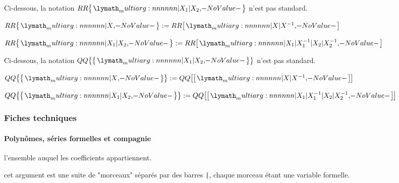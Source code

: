 \documentclass[12pt,a4paper]{article}
\newcommand\QQ{QQ}
\newcommand\RR{RR}
\newcommand\eqdef{:=}
\begin{document}

Ci-dessous, la notation $\setpolylaurent{\RR}{X_1 | X_2}$ n'est pas standard.

\begin{latexex}
$\setpolylaurent{\RR}{X} \eqdef
 \setpoly{\RR}{X | X^{-1}}$

$\setpolylaurent{\RR}{X_1 | X_2} \eqdef
 \setpoly{\RR}{X_1 | X_1^{-1} %
             | X_2 | X_2^{-1}}$
\end{latexex}





Ci-dessous, la notation $\setserielaurent{\QQ}{X_1 | X_2}$ n'est pas standard.

\begin{latexex}
$\setserielaurent{\QQ}{X} \eqdef
 \setserie{\QQ}{X | X^{-1}}$

$\setserielaurent{\QQ}{X_1 | X_2} \eqdef
 \setserie{\QQ}{X_1 | X_1^{-1} %
              | X_2 | X_2^{-1}}$
\end{latexex}




\subsubsection{Fiches techniques}

\paragraph{Polynômes, séries formelles et compagnie}



\extraspace



\extraspace



 l'ensemble auquel les coefficients appartiennent.

 cet argument est une suite de "morceaux" séparés par des barres \verb+|+, chaque morceau étant une variable formelle.
\end{document}
